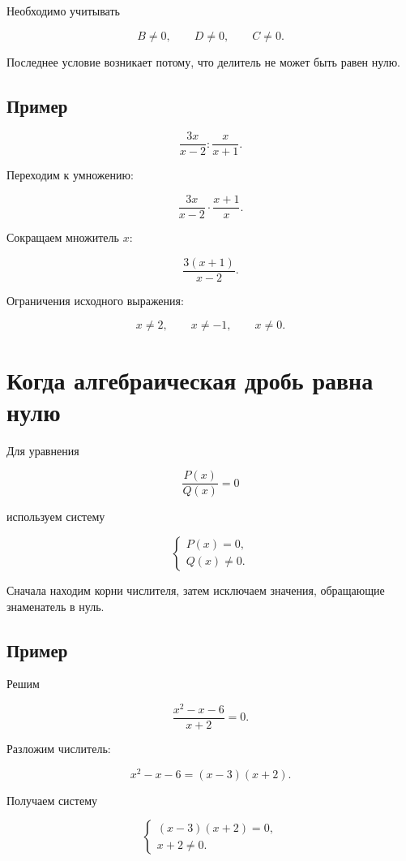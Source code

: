 \documentclass[a4paper,12pt]{article}
\begin{document}
Необходимо учитывать

\[
B\ne0,\qquad D\ne0,\qquad C\ne0.
\]

Последнее условие возникает потому, что делитель не может быть равен нулю.

\subsection{Пример}

\[
\frac{3x}{x-2}:\frac{x}{x+1}.
\]

Переходим к умножению:

\[
\frac{3x}{x-2}\cdot\frac{x+1}{x}.
\]

Сокращаем множитель \(x\):

\[
\boxed{
\frac{3(x+1)}{x-2}
}.
\]

Ограничения исходного выражения:

\[
\boxed{
x\ne2,\qquad x\ne-1,\qquad x\ne0.
}
\]


\section{Когда алгебраическая дробь равна нулю}

Для уравнения

\[
\frac{P(x)}{Q(x)}=0
\]

используем систему

\[
\boxed{
\begin{cases}
P(x)=0,\\
Q(x)\ne0.
\end{cases}
}
\]

Сначала находим корни числителя, затем исключаем значения,
обращающие знаменатель в нуль.

\subsection{Пример}

Решим

\[
\frac{x^2-x-6}{x+2}=0.
\]

Разложим числитель:

\[
x^2-x-6=(x-3)(x+2).
\]

Получаем систему

\[
\begin{cases}
(x-3)(x+2)=0,\\
x+2\ne0.
\end{cases}
\]
\end{document}
